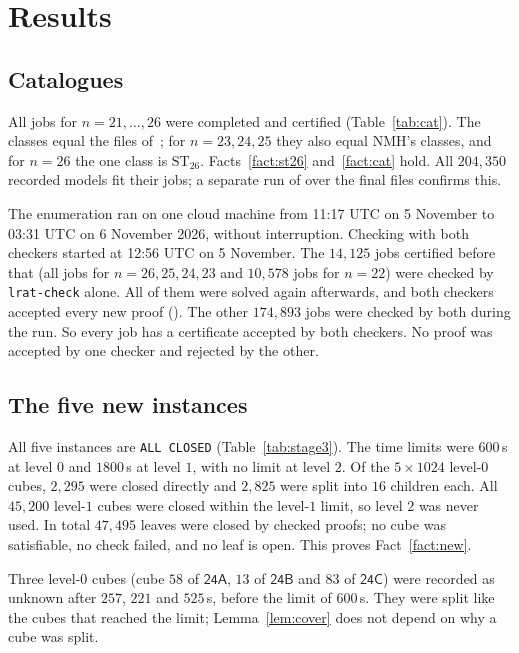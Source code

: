 \documentclass[11pt]{amsart}
\theoremstyle{definition}
\theoremstyle{remark}
\newcommand{\ST}[1]{\mathrm{ST}_{#1}}
\newcommand{\cl}[1]{\textsf{#1}}
\begin{document}
\section{Results}\label{sec:results}

\subsection{Catalogues}\label{sec:catres}
All jobs for $n=21,\dots,26$ were completed and certified (Table~\ref{tab:cat}).
The classes equal the files of~\cite{LLHrepo}; for $n=23,24,25$ they also equal
NMH's classes, and for $n=26$ the one class is $\ST{26}$.
Facts~\ref{fact:st26} and~\ref{fact:cat} hold. All $204{,}350$ recorded models
fit their jobs; a separate run of  over the
final files confirms this.

The enumeration ran on one cloud machine from 11:17 UTC on 5 November to
03:31 UTC on 6 November 2026, without interruption. Checking with both
checkers started at 12:56 UTC on 5 November. The $14{,}125$ jobs certified
before that (all jobs for $n=26,25,24,23$ and $10{,}578$ jobs for $n=22$) were
checked by \texttt{lrat-check} alone. All of them were solved again afterwards,
and both checkers accepted every new proof (). The
other $174{,}893$ jobs were checked by both during the run. So every job has a
certificate accepted by both checkers. No proof was accepted by one checker
and rejected by the other.

\subsection{The five new instances}\label{sec:stage3}
All five instances are \texttt{ALL CLOSED} (Table~\ref{tab:stage3}). The time
limits were $600$\,s at level $0$ and $1800$\,s at level $1$, with no limit at
level $2$. Of the $5 \times 1024$ level-$0$ cubes, $2{,}295$ were closed
directly and $2{,}825$ were split into $16$ children each. All $45{,}200$
level-$1$ cubes were closed within the level-$1$ limit, so level $2$ was never
used. In total $47{,}495$ leaves were closed by checked proofs; no cube was
satisfiable, no check failed, and no leaf is open. This proves
Fact~\ref{fact:new}.

Three level-$0$ cubes (cube $58$ of $\cl{24A}$, $13$ of $\cl{24B}$ and $83$ of
$\cl{24C}$) were recorded as unknown after $257$, $221$ and $525$\,s, before
the limit of $600$\,s. They were split like the cubes that reached the limit;
Lemma~\ref{lem:cover} does not depend on why a cube was split.
\end{document}
